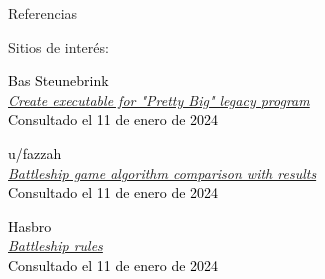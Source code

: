 \begin{frame}{Referencias}
\begin{block}{Sitios de interés:}
\begin{thebibliography}{10}

\textcolor{black}{Bas Steunebrink}\\
\emph{\href{https://groups.google.com/g/racket-users/c/uAfGFOTh3J8}{Create executable for "Pretty Big" legacy program}}\\
\textcolor{black}{Consultado el 11 de enero de 2024}

\textcolor{black}{u/fazzah}\\
\emph{\href{https://www.reddit.com/r/dataisbeautiful/comments/4m0vut/battleship_game_algorithm_comparison_with_results/}{Battleship game algorithm comparison with results}}\\
\textcolor{black}{Consultado el 11 de enero de 2024}

\textcolor{black}{Hasbro}\\
\emph{\href{https://www.hasbro.com/common/instruct/battleship.pdf}{Battleship rules}}\\
\textcolor{black}{Consultado el 11 de enero de 2024}




\end{thebibliography}
\end{block}
\end{frame}


